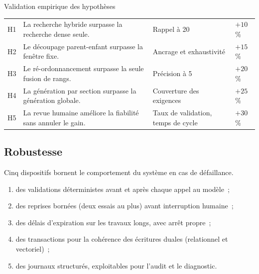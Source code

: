 \begin{btptable}{Validation empirique des hypothèses}
\label{tab:validation-h}
\begin{tabularx}{\linewidth}{@{}C{1.1cm} Y L{3.8cm} C{1.8cm}@{}}
\toprule
{}
 &  &  &  \\
\midrule
H1 & La recherche hybride surpasse la recherche dense seule. & Rappel à 20 & $+10$\,\% \\
H2 & Le découpage parent-enfant surpasse la fenêtre fixe. & Ancrage et exhaustivité & $+15$\,\% \\
H3 & Le ré-ordonnancement surpasse la seule fusion de rangs. & Précision à 5 & $+20$\,\% \\
H4 & La génération par section surpasse la génération globale. & Couverture des exigences & $+25$\,\% \\
H5 & La revue humaine améliore la fiabilité sans annuler le gain. & Taux de validation, temps de cycle & $+30$\,\% \\
\bottomrule
\end{tabularx}
\end{btptable}

\subsection{Robustesse}

Cinq dispositifs bornent le comportement du système en cas de défaillance.

\begin{enumerate}
  \item des validations déterministes avant et après chaque appel au
        modèle~;
  \item des reprises bornées (deux essais au plus) avant interruption
        humaine~;
  \item des délais d'expiration sur les travaux longs, avec arrêt propre~;
  \item des transactions pour la cohérence des écritures duales (relationnel
        et vectoriel)~;
  \item des journaux structurés, exploitables pour l'audit et le diagnostic.
\end{enumerate}
